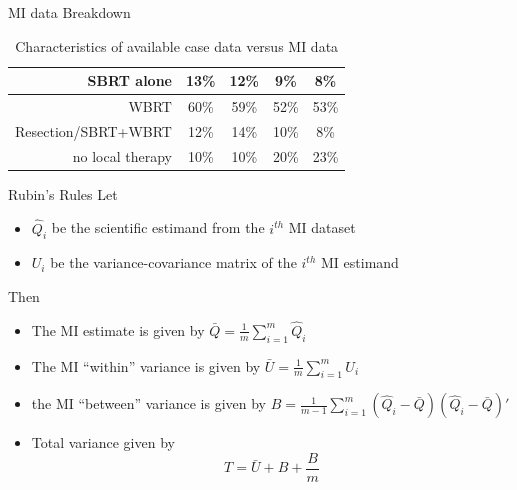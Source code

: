 \begin{frame}{MI data Breakdown}
\begin{table}[!ht]
{\begin{tabular}{|r|c|c|c|c|}
SBRT alone                                        & 13\%                                                                  & 12\%                                                      & 9\%                                                                      & 8\%                                                          \\ \hline
WBRT                                              & 60\%                                                                  & 59\%                                                      & 52\%                                                                     & 53\%                                                         \\ \hline
Resection/SBRT+WBRT                               & 12\%                                                                  & 14\%                                                      & 10\%                                                                     & 8\%                                                          \\ \hline
no local therapy                                  & 10\%                                                                  & 10\%                                                      & 20\%                                                                     & 23\%                                                         \\ \hline
\end{tabular}
}
\caption{Characteristics of available case data versus MI data}
\label{table:chartab}
\end{table}
 
\end{frame}

\begin{frame}{Rubin's Rules}
 Let
 \begin{itemize}
  \item $\hat{Q}_i$ be the scientific estimand from the $i^{th}$ MI dataset
  \item $U_i$ be the variance-covariance matrix of the $i^{th}$ MI estimand
 \end{itemize}
Then
\begin{itemize}
 \item The MI estimate is given by
 $\bar{Q}=\frac{1}{m}\sum_{i=1}^{m}\hat{Q}_i$
 \item The MI ``within'' variance is given by
 $\bar{U}=\frac{1}{m}\sum_{i=1}^{m}U_i$
 \item the MI ``between'' variance is given by
 $B=\frac{1}{m-1}\sum_{i=1}^{m}(\hat{Q}_i - \bar{Q})(\hat{Q}_i - \bar{Q})'$ %
   \item Total variance given by \cite{Rubin1987}
  $$T=\bar{U}+B +\frac{B}{m}$$
\end{itemize}

\end{frame}

